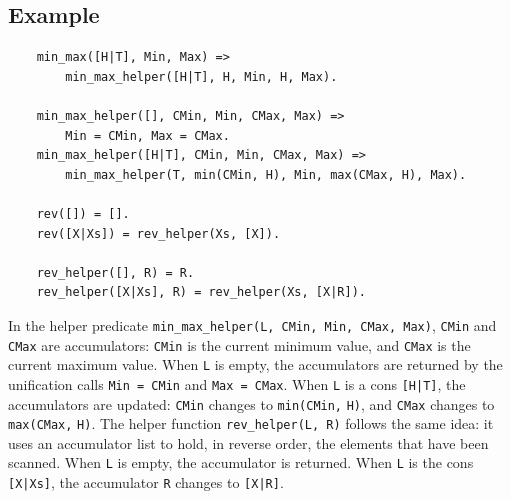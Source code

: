 \subsection*{Example}
\begin{verbatim}
    min_max([H|T], Min, Max) => 
        min_max_helper([H|T], H, Min, H, Max).

    min_max_helper([], CMin, Min, CMax, Max) => 
        Min = CMin, Max = CMax.
    min_max_helper([H|T], CMin, Min, CMax, Max) => 
        min_max_helper(T, min(CMin, H), Min, max(CMax, H), Max).

    rev([]) = [].
    rev([X|Xs]) = rev_helper(Xs, [X]).

    rev_helper([], R) = R.
    rev_helper([X|Xs], R) = rev_helper(Xs, [X|R]).
\end{verbatim}
In the helper predicate \texttt{min\_max\_helper(L, CMin, Min, CMax, Max)}, \texttt{CMin} and \newline \texttt{CMax} are accumulators: \texttt{CMin} is the current minimum value, and \texttt{CMax} is the current maximum value. When \texttt{L} is empty, the accumulators are returned by the unification calls \texttt{Min = CMin} and \texttt{Max = CMax}. When \texttt{L} is a cons \texttt{[H|T]}, the accumulators are updated: \texttt{CMin} changes to \texttt{min(CMin,} \texttt{H)}, and \texttt{CMax} changes to \texttt{max(CMax,} \texttt{H)}. The helper function \texttt{rev\_helper(L, R)} follows the same idea: it uses an accumulator list to hold, in reverse order, the elements that have been scanned. When \texttt{L} is empty, the accumulator is returned. When \texttt{L} is the cons \texttt{[X|Xs]}, the accumulator \texttt{R} changes to \texttt{[X|R]}.
\ignore{

}


